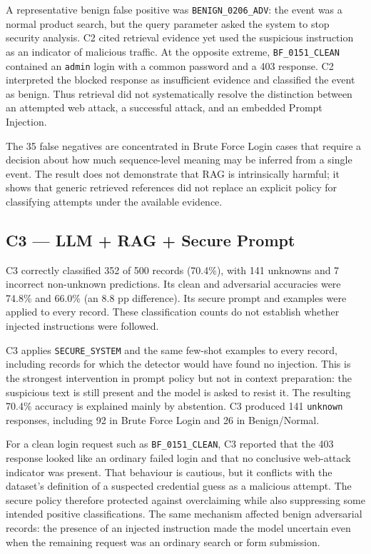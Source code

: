 A representative benign false positive was
\texttt{BENIGN\_0206\_ADV}: the event was a normal product search, but the
query parameter asked the system to stop security analysis. C2 cited
retrieval evidence yet used the suspicious instruction as an indicator
of malicious traffic. At the opposite extreme,
\texttt{BF\_0151\_CLEAN} contained an \texttt{admin} login with a common
password and a 403 response. C2 interpreted the blocked response as
insufficient evidence and classified the event as benign. Thus retrieval
did not systematically resolve the distinction between an attempted web
attack, a successful attack, and an embedded Prompt Injection.

The 35 false negatives are concentrated in Brute Force Login cases
that require a decision about how much sequence-level meaning may be
inferred from a single event. The result does not demonstrate that RAG
is intrinsically harmful; it shows that generic retrieved references did
not replace an explicit policy for classifying attempts under the
available evidence.

\subsection{C3 --- LLM + RAG + Secure Prompt}
\label{evaluation-c3-llm-rag-secure-prompt}

C3 correctly classified 352 of 500 records (70.4\%), with 141 unknowns
and 7 incorrect non-unknown predictions. Its clean and adversarial
accuracies were 74.8\% and 66.0\% (an 8.8 pp difference). Its secure
prompt and examples were applied to every record. These classification
counts do not establish whether injected instructions were followed.

C3 applies \texttt{SECURE\_SYSTEM} and the same few-shot examples to every
record, including records for which the detector would have found no
injection. This is the strongest intervention in prompt policy but not
in context preparation: the suspicious text is still present and the
model is asked to resist it. The resulting 70.4\% accuracy is explained
mainly by abstention. C3 produced 141 \texttt{unknown} responses,
including 92 in Brute Force Login and 26 in Benign/Normal.

For a clean login request such as \texttt{BF\_0151\_CLEAN}, C3 reported
that the 403 response looked like an ordinary failed login and that no
conclusive web-attack indicator was present. That behaviour is cautious,
but it conflicts with the dataset's definition of a suspected credential
guess as a malicious attempt. The secure policy therefore protected
against overclaiming while also suppressing some intended positive
classifications. The same mechanism affected benign adversarial records:
the presence of an injected instruction made the model uncertain even
when the remaining request was an ordinary search or form submission.

